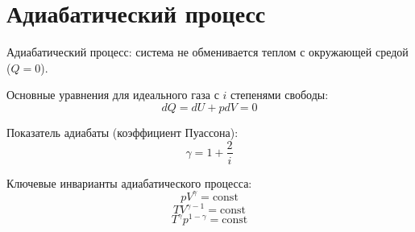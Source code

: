 \documentclass{article}
\begin{document}
\section*{Адиабатический процесс}

Адиабатический процесс: система не обменивается теплом с окружающей средой ($Q=0$).

Основные уравнения для идеального газа с $i$ степенями свободы:
\[
dQ = dU + pdV = 0
\]

Показатель адиабаты (коэффициент Пуассона):
\[
\gamma = 1 + \frac{2}{i}
\]

Ключевые инварианты адиабатического процесса:
\[
pV^{\gamma} = \text{const}
\]
\[
TV^{\gamma-1} = \text{const}
\]
\[
T^{\gamma}p^{1-\gamma} = \text{const}
\]
\end{document}
